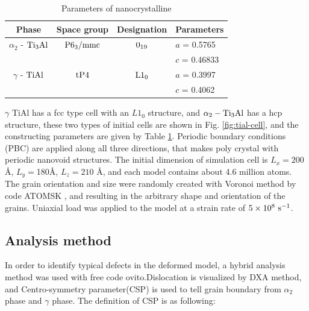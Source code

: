 \documentclass[metals,article,submit,moreauthors,pdftex,10pt,a4paper]{Definitions/mdpi}
\begin{document}
\begin{table}[ht]
	\caption{Parameters of nanocrystalline}
	\centering
	\begin{tabular}{c c c l}
	\toprule
	\textbf{Phase}			& {Space group}		& {Designation} 		& {Parameters} \\
	\midrule
	$\alpha_2$ - $\rm{Ti_3Al}$		& $\rm P6_3/mmc$ 	& $\rm 0_{19}$ 		& $a$ = 0.5765 \\
		&					&					& $c$ = 0.46833 \\
	$\gamma$ - $\rm{TiAl}$ 		& $\rm tP4$ 		& $\rm L1_0$		& $a$ = 0.3997 \\
		&					&					& $c$ = 0.4062 \\			
	\bottomrule
	\end{tabular} 
	\label{tab:lattice_parameter}
\end{table} 

$\gamma $ TiAl has a fcc type cell with an $L1_0$ structure, and $\alpha_2 -\rm Ti_3Al$ has a hcp structure, these two types of initial cells are shown in Fig. \ref{fig:tial-cell}, and the constructing parameters are given by Table \ref{tab:lattice_parameter}. Periodic boundary conditions (PBC) are applied along all three directions, that makes poly crystal with periodic nanovoid structures. The initial dimension of simulation cell is $L_x =200$ \si{\angstrom}, $L_y = $180\si{\angstrom}, $L_z = 210$ \si{\angstrom}, and each model contains about 4.6 million atoms. The grain orientation and size were randomly created with Voronoi method by code ATOMSK \cite{Hirel2015}, and resulting in the arbitrary shape and orientation of the grains. Uniaxial load was applied to the model at a strain rate of $5\times10^8\ \rm{s}^{-1}$. 
\subsection{Analysis method}
In order to identify typical defects in the deformed model, a hybrid analysis method was used with free code ovito\cite{Stukowski2010a}.Dislocation is visualized by DXA method, and Centro-symmetry parameter(CSP) is used to tell grain boundary from  $\alpha_2$ phase and $\gamma$ phase. The definition of CSP is as following:
\end{document}
